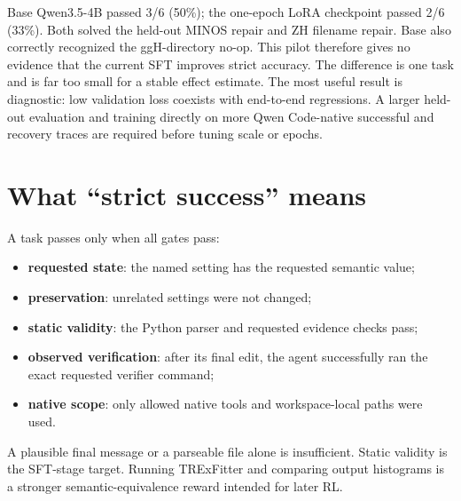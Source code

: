 \documentclass[10.5pt]{article}
\begin{document}
Base Qwen3.5-4B passed 3/6 (50\%); the one-epoch LoRA checkpoint passed 2/6
(33\%).  Both solved the held-out MINOS repair and ZH filename repair.  Base
also correctly recognized the ggH-directory no-op.  This pilot therefore gives
no evidence that the current SFT improves strict accuracy.  The difference is
one task and is far too small for a stable effect estimate.  The most useful
result is diagnostic: low validation loss coexists with end-to-end regressions.
A larger held-out evaluation and training directly on more Qwen Code-native
successful and recovery traces are required before tuning scale or epochs.

\section{What ``strict success'' means}
A task passes only when all gates pass:
\begin{itemize}
  \item \textbf{requested state}: the named setting has the requested semantic value;
  \item \textbf{preservation}: unrelated settings were not changed;
  \item \textbf{static validity}: the Python parser and requested evidence checks pass;
  \item \textbf{observed verification}: after its final edit, the agent successfully
        ran the exact requested verifier command;
  \item \textbf{native scope}: only allowed native tools and workspace-local paths were used.
\end{itemize}
A plausible final message or a parseable file alone is insufficient.  Static
validity is the SFT-stage target.  Running TRExFitter and comparing output
histograms is a stronger semantic-equivalence reward intended for later RL.
\end{document}
